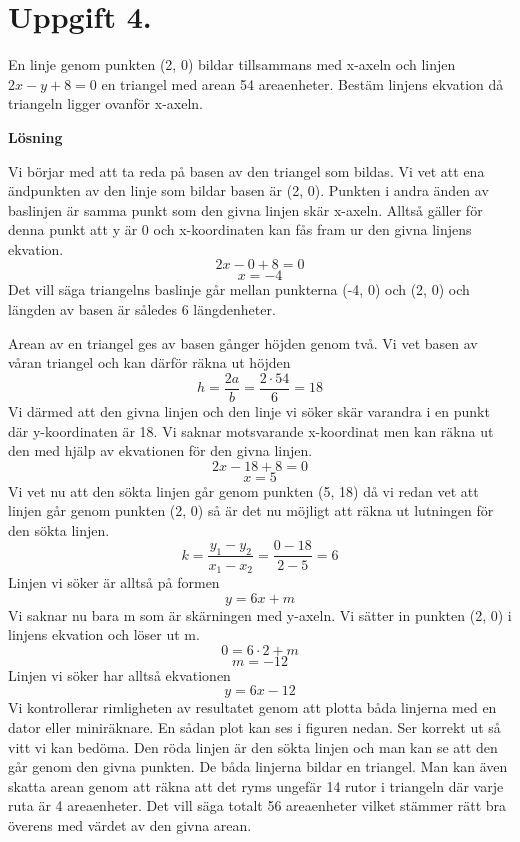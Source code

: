 \documentclass[fleqn]{article}
\begin{document}
\newpage
\section*{Uppgift 4.}
En linje genom punkten (2, 0) bildar tillsammans med x-axeln och linjen\\
 $2x-y+8=0$ en triangel med arean 54 areaenheter. Bestäm linjens ekvation då triangeln ligger ovanför x-axeln.

\textbf{Lösning}

Vi börjar med att ta reda på basen av den triangel som bildas. Vi vet att ena ändpunkten av den linje som bildar basen är (2, 0). Punkten i andra änden av baslinjen är samma punkt som den givna linjen skär x-axeln. Alltså gäller för denna punkt att y är 0 och x-koordinaten kan fås fram ur den givna linjens ekvation.
\[
2x - 0 + 8 = 0
\]
\[
x = -4
\]
Det vill säga triangelns baslinje går mellan punkterna (-4, 0) och (2, 0) och längden av basen är således 6 längdenheter.

Arean av en triangel ges av basen gånger höjden genom två. Vi vet basen av våran triangel och kan därför räkna ut höjden
\[
h = \dfrac{2a}{b} = \dfrac{2 \cdot 54}{6} = 18 
\]
Vi därmed att den givna linjen och den linje vi söker skär varandra i en punkt där y-koordinaten är 18. Vi saknar motsvarande x-koordinat men kan räkna ut den med hjälp av ekvationen för den givna linjen.
\[
2x - 18 + 8 = 0
\]
\[
x = 5
\]
Vi vet nu att den sökta linjen går genom punkten (5, 18) då vi redan vet att linjen går genom punkten (2, 0) så är det nu möjligt att räkna ut lutningen för den sökta linjen.
\[
k = \dfrac{y_1 - y_2}{x_1 - x_2} = \dfrac{0 - 18}{2 - 5} = 6
\]
Linjen vi söker är alltså på formen
\[
y = 6x + m
\]
Vi saknar nu bara m som är skärningen med y-axeln. Vi sätter in punkten (2, 0) i linjens ekvation och löser ut m.
\[
0 = 6 \cdot 2 + m
\]
\[
m = -12
\]
Linjen vi söker har alltså ekvationen
\[
y = 6x - 12
\]
Vi kontrollerar rimligheten av resultatet genom att plotta båda linjerna med en dator eller miniräknare. En sådan plot kan ses i figuren nedan. Ser korrekt ut så vitt vi kan bedöma. Den röda linjen är den sökta linjen och man kan se att den går genom den givna punkten. De båda linjerna bildar en triangel. Man kan även skatta arean genom att räkna att det ryms ungefär 14 rutor i triangeln där varje ruta är 4 areaenheter. Det vill säga totalt 56 areaenheter vilket stämmer rätt bra överens med värdet av den givna arean.

\end{document}
